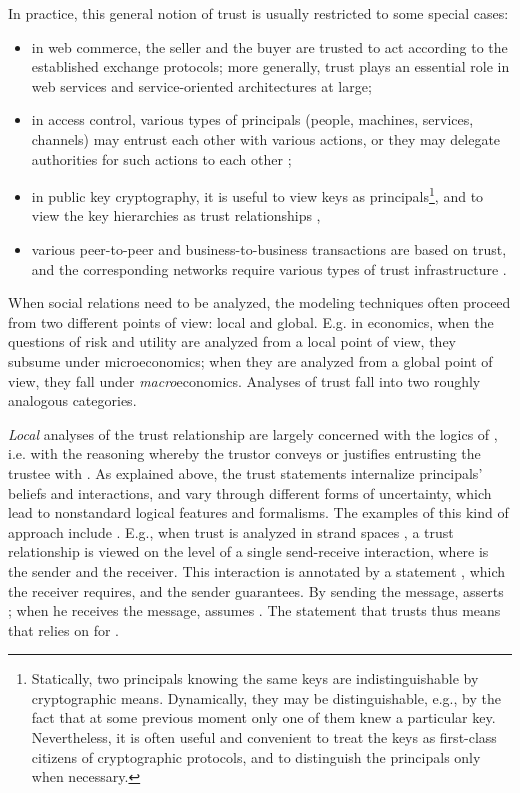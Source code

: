 \documentclass{llncs}
\begin{document}
In practice, this general notion of trust is usually restricted to some special cases:
\begin{itemize}
\item in web commerce, the seller and the buyer are trusted to act according to the established exchange protocols; more generally, trust plays an essential role in web services and service-oriented architectures at large;
\item in access control, various types of principals (people, machines, services, channels) may entrust each other with various actions, or they may delegate authorities for such actions to each other \cite{Benantar:AC,LampsonB:AC};
\item in public key cryptography, it is useful to view keys as principals\footnote{Statically, two principals knowing the same keys are indistinguishable by cryptographic means. Dynamically, they may be distinguishable, e.g., by the fact that at some previous moment only one of them knew a particular key. Nevertheless, it is often useful and convenient to treat the keys as first-class citizens of cryptographic protocols, and to distinguish the principals only when necessary.}, and to view the key hierarchies as trust relationships \cite{BBK,LevienR,MaurerU:Trust,ReiterM:Metric},
\item various peer-to-peer and business-to-business transactions are based on trust, and the corresponding networks require various types of trust infrastructure \cite{Guha-Tomkins,Garcia-Molina:eigentrust,Karabulut,Garcia-Molina:Taxonomy}.
\end{itemize}

When social relations need to be analyzed, the modeling techniques often proceed from two different points of view: local and global. E.g. in economics, when the questions of risk and utility are analyzed from a local point of view, they subsume under microeconomics; when they are analyzed from a global point of view, they fall under {\em macro\/}economics. Analyses of trust fall into two roughly analogous categories. 

{\em Local\/} analyses of the trust relationship   are largely concerned with the logics of , i.e. with the reasoning whereby the trustor  conveys or justifies entrusting the trustee  with . As explained above, the trust statements internalize principals' beliefs and interactions, and vary through different forms of uncertainty, which lead to nonstandard logical features and formalisms. The examples of this kind of approach include \cite{SassoneV:Trust,GuttmanJ:Trust,JosangA:Subjlog,LampsonB:AC,Ninghui:Trust,Ninghui:JACM}. E.g., when trust is analyzed in strand spaces \cite{GuttmanJ:Trust}, a trust relationship  is viewed on the level of a single send-receive interaction, where  is the sender and  the receiver. This interaction is annotated by a statement , which the receiver  requires, and the sender  guarantees. By sending the message,  asserts ; when he receives the message,  assumes . The statement that  trusts  thus means that  relies on  for .
\end{document}
